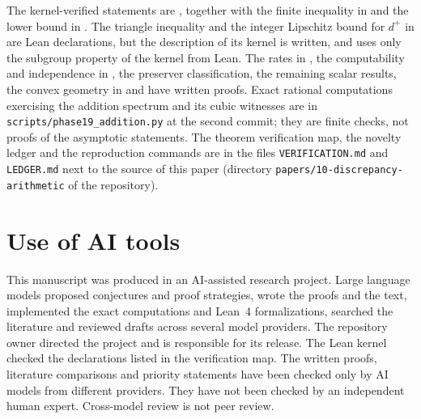 \documentclass[11pt]{article}
\newcommand{\ttt}[1]{\texttt{#1}}
\begin{document}
The kernel-verified statements are
, together with the finite
inequality in  and the lower bound in . The triangle inequality
and the integer Lipschitz bound for $d^+$ in  are Lean declarations, but the
description of its kernel is written, and  uses only the subgroup property of the
kernel from Lean. The rates in , the computability and
independence in , the preserver classification, the remaining scalar results, the
convex geometry in  and
 have written proofs. Exact rational computations
exercising the addition spectrum and its cubic witnesses are in \ttt{scripts/phase19\_addition.py} at
the second commit; they are finite checks, not proofs of the asymptotic statements. The theorem
verification map, the novelty ledger and the reproduction commands are in the files
\ttt{VERIFICATION.md} and \ttt{LEDGER.md} next to the source of this paper
(directory \ttt{papers/10-discrepancy-arithmetic} of the repository).

\section{Use of AI tools}

This manuscript was produced in an AI-assisted research project. Large language models proposed
conjectures and proof strategies, wrote the proofs and the text, implemented the exact computations
and Lean~4 formalizations, searched the literature and reviewed drafts across several model providers.
The repository owner directed the project and is responsible for its release. The Lean kernel checked
the declarations listed in the verification map. The written proofs, literature comparisons and
priority statements have been checked only by AI models from different providers. They have not been
checked by an independent human expert. Cross-model review is not peer review.



\end{document}
